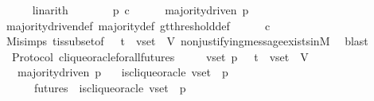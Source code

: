\begin{isabellebody}
\ \ \ \ \isamarkupfalse%
\ linarith\ \ \isanewline
\ \ \isamarkupfalse%
\ \isamarkupfalse%
\ {\isachardoublequoteopen}p\ c{\isachardoublequoteclose}\isanewline
\ \ \ \ \isamarkupfalse%
\ {\isacartoucheopen}majority{\isacharunderscore}driven\ p{\isacartoucheclose}\ \isamarkupfalse%
\ majority{\isacharunderscore}driven{\isacharunderscore}def\ majority{\isacharunderscore}def\ gt{\isacharunderscore}threshold{\isacharunderscore}def\isanewline
\ \ \ \ \isamarkupfalse%
\ {\isacartoucheopen}c\ {\isasymin}\ {\isasymepsilon}\ {\isasymsigma}{\isacartoucheclose}\ \isanewline
\ \ \ \ \isamarkupfalse%
\ Mi{\isachardot}simps\ {\isasymSigma}t{\isacharunderscore}is{\isacharunderscore}subset{\isacharunderscore}of{\isacharunderscore}{\isasymSigma}\ {\isacartoucheopen}{\isasymsigma}\ {\isasymin}\ {\isasymSigma}t\ {\isasymand}\ v{\isacharunderscore}set\ {\isasymsubseteq}\ V{\isacartoucheclose}\ non{\isacharunderscore}justifying{\isacharunderscore}message{\isacharunderscore}exists{\isacharunderscore}in{\isacharunderscore}M{\isacharunderscore}{}\ \isamarkupfalse%
\ blast\ \ \ \ \isanewline
{}\isamarkupfalse%
%
\endisatagproof
{\isafoldproof}%
%
\isadelimproof
\isanewline
%
\endisadelimproof
\isanewline
\isanewline
{}\isamarkupfalse%
\ {\isacharparenleft}\ Protocol{\isacharparenright}\ clique{\isacharunderscore}oracle{\isacharunderscore}for{\isacharunderscore}all{\isacharunderscore}futures\ {\isacharcolon}\isanewline
\ \ {\isachardoublequoteopen}{\isasymforall}\ {\isasymsigma}\ v{\isacharunderscore}set\ p{\isachardot}\ {\isasymsigma}\ {\isasymin}\ {\isasymSigma}t\ {\isasymand}\ v{\isacharunderscore}set\ {\isasymsubseteq}\ V\ \isanewline
\ \ {\isasymlongrightarrow}\ majority{\isacharunderscore}driven\ p\isanewline
\ \ {\isasymlongrightarrow}\ is{\isacharunderscore}clique{\isacharunderscore}oracle\ {\isacharparenleft}v{\isacharunderscore}set{\isacharcomma}\ {\isasymsigma}{\isacharcomma}\ p{\isacharparenright}\ \isanewline
\ \ {\isasymlongrightarrow}\ {\isacharparenleft}{\isasymforall}\ {\isasymsigma}{\isacharprime}\ {\isasymin}\ futures\ {\isasymsigma}{\isachardot}\ is{\isacharunderscore}clique{\isacharunderscore}oracle\ {\isacharparenleft}v{\isacharunderscore}set{\isacharcomma}\ {\isasymsigma}{\isacharprime}{\isacharcomma}\ p{\isacharparenright}{\isacharparenright}{\isachardoublequoteclose}\isanewline
%
\isadelimproof
\ \ %
\endisadelimproof
%
\isatagproof
{}\isamarkupfalse%

\end{isabellebody}
